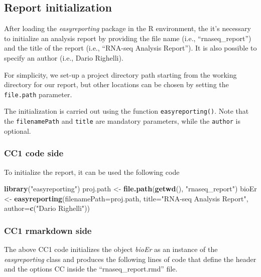 \documentclass[]{article}
\newenvironment{Shaded}{\begin{snugshade}}{\end{snugshade}}
\newcommand{\DataTypeTok}[1]{\textcolor[rgb]{0.13,0.29,0.53}{#1}}
\newcommand{\KeywordTok}[1]{\textcolor[rgb]{0.13,0.29,0.53}{\textbf{#1}}}
\newcommand{\NormalTok}[1]{#1}
\newcommand{\StringTok}[1]{\textcolor[rgb]{0.31,0.60,0.02}{#1}}
\begin{document}
\hypertarget{report-initialization}{%
\subsection{Report initialization}\label{report-initialization}}

After loading the \emph{easyreporting} package in the R environment, the
it's necessary to initialize an analysis report by providing the file
name (i.e., ``rnaseq\_report'') and the title of the report (i.e.,
``RNA-seq Analysis Report''). It is also possible to specify an author
(i.e., Dario Righelli).

For simplicity, we set-up a project directory path starting from the
working directory for our report, but other locations can be chosen by
setting the \texttt{file.path} parameter.

The initialization is carried out using the function
\texttt{easyreporting()}. Note that the \texttt{filenamePath} and
\texttt{title} are mandatory parameters, while the \texttt{author} is
optional.

\hypertarget{cc1-code-side}{%
\subsubsection{CC1 code side}\label{cc1-code-side}}

To initialize the report, it can be used the following code

\begin{Shaded}
\begin{Highlighting}[]
\KeywordTok{library}\NormalTok{(}\StringTok{"easyreporting"}\NormalTok{)}
\NormalTok{proj.path <-}\StringTok{ }\KeywordTok{file.path}\NormalTok{(}\KeywordTok{getwd}\NormalTok{(), }\StringTok{"rnaseq_report"}\NormalTok{)}
\NormalTok{bioEr <-}\StringTok{ }\KeywordTok{easyreporting}\NormalTok{(}\DataTypeTok{filenamePath=}\NormalTok{proj.path, }\DataTypeTok{title=}\StringTok{"RNA-seq Analysis Report"}\NormalTok{,}
                       \DataTypeTok{author=}\KeywordTok{c}\NormalTok{(}\StringTok{"Dario Righelli"}\NormalTok{))}
\end{Highlighting}
\end{Shaded}

\hypertarget{cc1-rmarkdown-side}{%
\subsubsection{CC1 rmarkdown side}\label{cc1-rmarkdown-side}}

The above CC1 code initializes the object \emph{bioEr} as an instance of
the \emph{easyreporting} class and produces the following lines of code
that define the header and the options CC inside the
``rnaseq\_report.rmd'' file.
\end{document}
